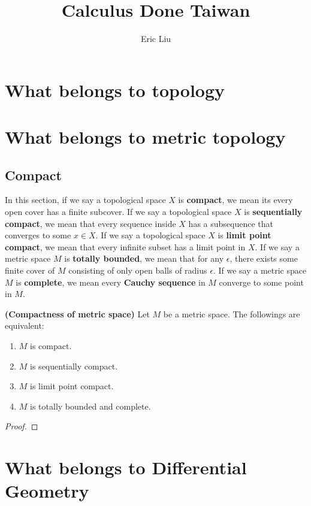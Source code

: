 \documentclass{report}
\title{Calculus Done Taiwan}
\author{Eric Liu}
\date{}
\begin{document}
\maketitle
\newpage%

\tableofcontents
\pagebreak
\chapter{What belongs to topology}

\chapter{What belongs to metric topology}
\section{Compact}
In this section, if we say a topological space $X$ is \textbf{compact}, we mean its every open cover has a finite subcover. If we say a topological space $X$ is \textbf{sequentially compact}, we mean that every sequence inside $X$ has a subsequence that converges to some $x\in X$. If we say a topological space $X$ is \textbf{limit point compact}, we mean that every infinite subset has a limit point in $X$. If we say a metric space $M$ is \textbf{totally bounded}, we mean that for any $\epsilon $, there exists some finite cover of $M$ consisting of only open balls of radius  $\epsilon $. If we say a metric space $M$ is  \textbf{complete}, we mean every \textbf{Cauchy sequence} in $M$ converge to some point in  $M$.  
\begin{equiv_def}
\label{Com}
\textbf{(Compactness of metric space)} Let $M$ be a metric space. The followings are equivalent: 
\begin{enumerate}[label=(\roman*)]
  \item $M$ is compact. 
  \item $M$ is sequentially compact. 
  \item $M$ is limit point compact. 
  \item $M$ is totally bounded and complete. 
\end{enumerate}
\end{equiv_def}
\begin{proof}

\end{proof}
\chapter{What belongs to Differential Geometry}
\end{document}
